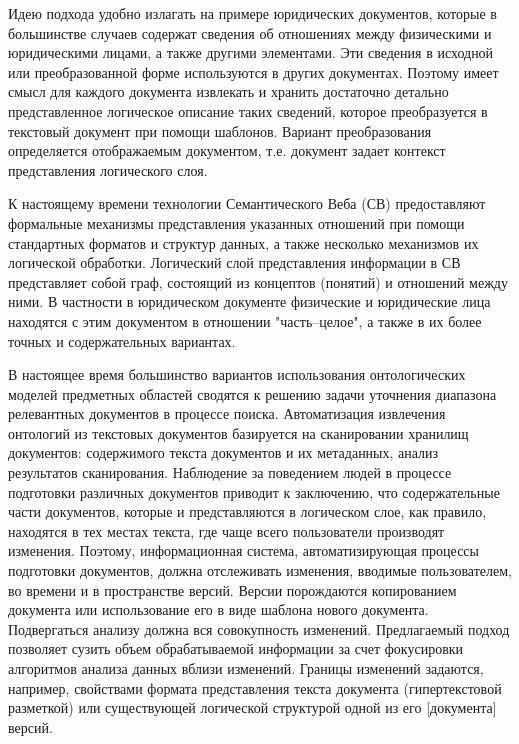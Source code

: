 \documentclass[utf8]{../IncArticle}
\begin{document}
Идею подхода удобно излагать на примере юридических документов,
которые в большинстве случаев содержат сведения об отношениях между
физическими и юридическими лицами, а также другими элементами. Эти
сведения в исходной или преобразованной форме используются в других
документах. Поэтому имеет смысл для каждого документа извлекать и
хранить достаточно детально представленное логическое описание таких
сведений, которое преобразуется в текстовый документ при помощи
шаблонов. Вариант преобразования определяется отображаемым документом,
т.е. документ задает контекст представления логического слоя.

К настоящему времени технологии Семантического Веба (СВ) предоставляют
формальные механизмы представления указанных отношений при помощи
стандартных форматов и структур данных, а также несколько механизмов
их логической обработки. Логический слой представления информации в СВ
представляет собой граф, состоящий из концептов (понятий) и отношений
между ними. В частности в юридическом документе физические и
юридические лица находятся с этим документом в отношении
"часть--целое", а также в их более точных и содержательных вариантах.

В настоящее время большинство вариантов использования онтологических
моделей предметных областей сводятся к решению задачи уточнения
диапазона релевантных документов в процессе поиска. Автоматизация
извлечения онтологий из текстовых документов базируется на
сканировании хранилищ документов: содержимого текста документов и их
метаданных, анализ результатов сканирования. Наблюдение за поведением
людей в процессе подготовки различных документов приводит к
заключению, что содержательные части документов, которые и
представляются в логическом слое, как правило, находятся в тех местах
текста, где чаще всего пользователи производят изменения. Поэтому,
информационная система, автоматизирующая процессы подготовки
документов, должна отслеживать изменения, вводимые пользователем, во
времени и в пространстве версий. Версии порождаются копированием
документа или использование его в виде шаблона нового
документа. Подвергаться анализу должна вся совокупность
изменений. Предлагаемый подход позволяет сузить объем обрабатываемой
информации за счет фокусировки алгоритмов анализа данных вблизи
изменений. Границы изменений задаются, например, свойствами формата
представления текста документа (гипертекстовой разметкой) или
существующей логической структурой одной из его [документа] версий.
\end{document}
